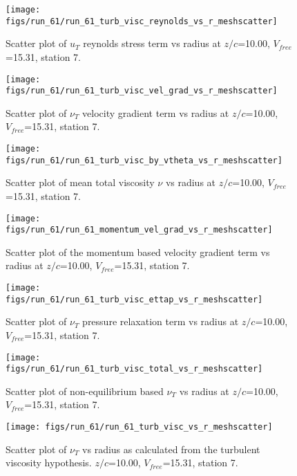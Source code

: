\begin{figure}[H]
\centering
\texttt{[image: figs/run\_61/run\_61\_turb\_visc\_reynolds\_vs\_r\_meshscatter]}
\caption{Scatter plot of $
u_T$ reynolds stress term vs radius at $z/c$=10.00, $V_{free}$=15.31, station 7.}
\end{figure}


\begin{figure}[H]
\centering
\texttt{[image: figs/run\_61/run\_61\_turb\_visc\_vel\_grad\_vs\_r\_meshscatter]}
\caption{Scatter plot of $\nu_T$ velocity gradient term vs radius at $z/c$=10.00, $V_{free}$=15.31, station 7.}
\end{figure}


\begin{figure}[H]
\centering
\texttt{[image: figs/run\_61/run\_61\_turb\_visc\_by\_vtheta\_vs\_r\_meshscatter]}
\caption{Scatter plot of mean total viscosity $\nu$ vs radius at $z/c$=10.00, $V_{free}$=15.31, station 7.}
\end{figure}


\begin{figure}[H]
\centering
\texttt{[image: figs/run\_61/run\_61\_momentum\_vel\_grad\_vs\_r\_meshscatter]}
\caption{Scatter plot of the momentum based velocity gradient term vs radius at $z/c$=10.00, $V_{free}$=15.31, station 7.}
\end{figure}


\begin{figure}[H]
\centering
\texttt{[image: figs/run\_61/run\_61\_turb\_visc\_ettap\_vs\_r\_meshscatter]}
\caption{Scatter plot of $\nu_T$ pressure relaxation term vs radius at $z/c$=10.00, $V_{free}$=15.31, station 7.}
\end{figure}


\begin{figure}[H]
\centering
\texttt{[image: figs/run\_61/run\_61\_turb\_visc\_total\_vs\_r\_meshscatter]}
\caption{Scatter plot of non-equilibrium based $\nu_T$ vs radius at $z/c$=10.00, $V_{free}$=15.31, station 7.}
\end{figure}


\begin{figure}[H]
\centering
\texttt{[image: figs/run\_61/run\_61\_turb\_visc\_vs\_r\_meshscatter]}
\caption{Scatter plot of $\nu_T$ vs radius as calculated from the turbulent viscosity hypothesis. $z/c$=10.00, $V_{free}$=15.31, station 7.}
\end{figure}


